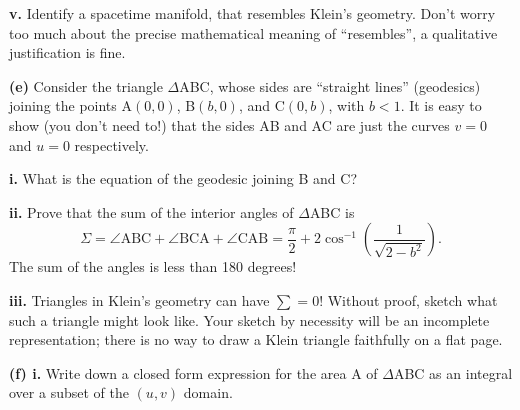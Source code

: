 \documentclass[a4paper]{article} %
\begin{document}
\pagebreak %

\begin{framed}
\textbf{v.} Identify a spacetime manifold, that resembles Klein's geometry. Don’t worry too much about the precise mathematical meaning of ``resembles'', a qualitative justification is fine.
\end{framed}

\pagebreak %

\begin{framed}
\textbf{(e)} Consider the triangle $\Delta$ABC, whose sides are ``straight lines'' (geodesics) joining the points A$(0,0)$, B$(b,0)$, and C$(0,b)$, with $b<1$. It is easy to show (you don't need to!) that the sides AB and AC are just the curves $v=0$ and $u=0$ respectively.
\end{framed}

\begin{framed}
\textbf{i.} What is the equation of the geodesic joining B and C?
\end{framed}

\pagebreak %

\begin{framed}
\textbf{ii.} Prove that the sum of the interior angles of $\Delta$ABC is
\begin{equation}
\Sigma = \angle\text{ABC}+\angle\text{BCA}+\angle\text{CAB}=\frac{\pi}{2}+2\cos^{-1}\left(\frac{1}{\sqrt{2-b^2}}\right).
\end{equation}
The sum of the angles is less than 180 degrees!
\end{framed}

\pagebreak %

\begin{framed}
\textbf{iii.} Triangles in Klein’s geometry can have $\sum=0$! Without proof, sketch what such a triangle might look like. Your sketch by necessity will be an incomplete representation; there is no way to draw a Klein triangle faithfully on a flat page.
\end{framed}

\pagebreak %

\begin{framed}
\textbf{(f) i.} Write down a closed form expression for the area A of $\Delta$ABC as an integral over a subset of the $(u,v)$ domain.
\end{framed}
\end{document}
